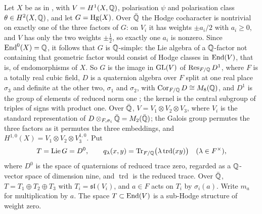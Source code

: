 \begin{setupenv}\label{setup:mumford}
Let $X$ be as in , with $V=H^{1}(X,\mathbb{Q})$,
polarisation $\psi$ and polarisation class $\theta\in H^{2}(X,\mathbb{Q})$, and let
$G=\operatorname{Hg}(X)$. Over $\bar{\mathbb{Q}}$ the Hodge cocharacter is nontrivial on exactly
one of the three factors of $G$: on $V_{i}$ it has weights $\pm a_{i}/2$ with
$a_{i}\ge0$, and $V$ has only the two weights $\pm\frac12$, so exactly one
$a_{i}$ is nonzero. Since $\operatorname{End}^{0}(X)=\mathbb{Q}$, it follows that $G$ is
$\mathbb{Q}$-simple: the Lie algebra of a $\mathbb{Q}$-factor not containing that geometric
factor would consist of Hodge classes in $\operatorname{End}(V)$, that is, of endomorphisms
of $X$. So $G$ is the image in
$\operatorname{GL}(V)$ of $\operatorname{Res}_{F/\mathbb{Q}}D^{1}$, where $F$ is a totally real cubic field, $D$
is a quaternion algebra over $F$ split at one real place $\sigma_{3}$ and
definite at the other two, $\sigma_{1}$ and $\sigma_{2}$, with
$\operatorname{Cor}_{F/\mathbb{Q}}D\cong M_{8}(\mathbb{Q})$, and $D^{1}$ is the group of
elements of reduced norm one \cite{Mum69,Gal00}; the kernel is the central
subgroup of triples of signs with product one. Over $\bar{\mathbb{Q}}$,
$V=V_{1}\otimes V_{2}\otimes V_{3}$, where $V_{i}$ is the standard
representation of $D\otimes_{F,\sigma_{i}}\bar{\mathbb{Q}}=M_{2}(\bar{\mathbb{Q}})$; the
Galois group permutes the three factors as it permutes the three embeddings,
and $H^{1,0}(X)=V_{1}\otimes V_{2}\otimes V_{3}^{1,0}$. Put
\[
  T=\operatorname{Lie}G=D^{0},
  \qquad
  q_{\lambda}(x,y)=\operatorname{Tr}_{F/\mathbb{Q}}\bigl(\lambda\operatorname{trd}(xy)\bigr)
  \quad(\lambda\in F^{\times}),
\]
where $D^{0}$ is the space of quaternions of reduced trace zero, regarded as
a $\mathbb{Q}$-vector space of dimension nine, and $\operatorname{trd}$ is the
reduced trace. Over $\bar{\mathbb{Q}}$, $T=T_{1}\oplus T_{2}\oplus T_{3}$ with
$T_{i}=\mathfrak{sl}(V_{i})$, and $a\in F$ acts on $T_{i}$ by $\sigma_{i}(a)$.
Write $m_{a}$ for multiplication by $a$. The space $T\subset\operatorname{End}(V)$ is a
sub-Hodge structure of weight zero.
\end{setupenv}

